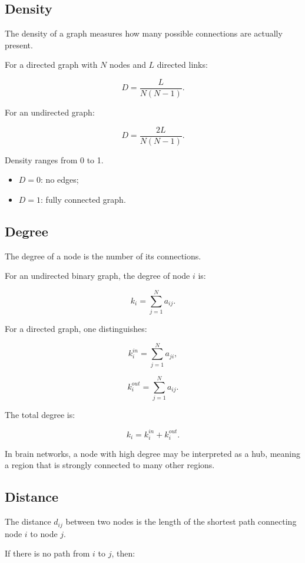 \subsection{Density}

The density of a graph measures how many possible connections are actually present.

For a directed graph with $N$ nodes and $L$ directed links:

\[
D =
\frac{L}{N(N-1)}.
\]

For an undirected graph:

\[
D =
\frac{2L}{N(N-1)}.
\]

Density ranges from 0 to 1.

\begin{itemize}[noitemsep]
    \item $D=0$: no edges;
    \item $D=1$: fully connected graph.
\end{itemize}

\subsection{Degree}

The degree of a node is the number of its connections.

For an undirected binary graph, the degree of node $i$ is:

\[
k_i =
\sum_{j=1}^{N}
a_{ij}.
\]

For a directed graph, one distinguishes:

\[
k_i^{in}
=
\sum_{j=1}^{N}
a_{ji},
\]

\[
k_i^{out}
=
\sum_{j=1}^{N}
a_{ij}.
\]

The total degree is:

\[
k_i =
k_i^{in} + k_i^{out}.
\]

\begin{authornote}
In brain networks, a node with high degree may be interpreted as a hub, meaning a region that is strongly connected to many other regions.
\end{authornote}

\subsection{Distance}

The distance $d_{ij}$ between two nodes is the length of the shortest path connecting node $i$ to node $j$.

If there is no path from $i$ to $j$, then:

